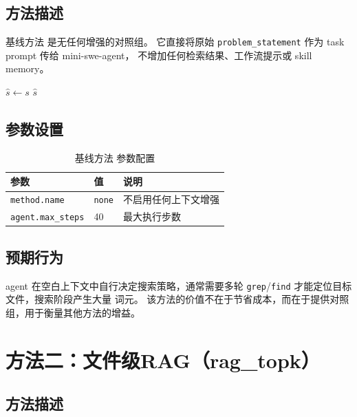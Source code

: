 \subsection{方法描述}

基线方法 是无任何增强的对照组。
它直接将原始 \texttt{problem\_statement} 作为 task prompt 传给 mini-swe-agent，
不增加任何检索结果、工作流提示或 skill memory。

\begin{algorithm}[H]
\caption{基线方法：baseline\_raw：}
\label{alg:baseline}
\BlankLine
$\hat{s} \leftarrow s$ 
\Return $\hat{s}$\;
\end{algorithm}

\subsection{参数设置}

\begin{table}[htbp]
\centering
\caption{基线方法 参数配置}
\label{tab:baseline-params}
\begin{tabular}{lll}
\toprule
参数 & 值 & 说明 \\
\midrule
\texttt{method.name} & \texttt{none} & 不启用任何上下文增强 \\
\texttt{agent.max\_steps} & 40 & 最大执行步数 \\
\bottomrule
\end{tabular}
\end{table}

\subsection{预期行为}

agent 在空白上下文中自行决定搜索策略，通常需要多轮 \texttt{grep}/\texttt{find}
才能定位目标文件，搜索阶段产生大量 词元。
该方法的价值不在于节省成本，而在于提供对照组，用于衡量其他方法的增益。

\section{方法二：文件级RAG（rag\_topk）}
\label{sec:rag-topk}

\subsection{方法描述}

